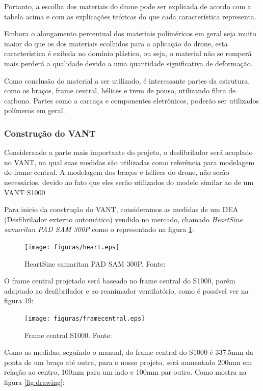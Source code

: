 Portanto, a escolha dos materiais do drone pode ser explicada de acordo com a tabela acima e com as explicações teóricas do que cada característica representa. 

Embora o alongamento percentual dos materiais poliméricos em geral seja muito maior do que os dos materiais ecolhidos para a aplicação do drone, esta característica é exibida no domínio plástico, ou seja, o material não se romperá mais perderá a qualidade devido a uma quantidade significativa de deformação.

Como conclusão do material a ser utilizado, é interessante partes da estrutura, como os braços, frame central, hélices e trem de pouso, utilizando fibra de carbono. Partes como a carcaça e componentes eletrônicos, poderão ser utilizados polímeros em geral. 

\subsubsection{Construção do VANT}

Considerando a parte mais importante do projeto, o desfibrilador será acoplado no VANT, na qual suas medidas são utilizadas como referência para modelagem do frame central.  A modelagem dos braços e hélices do drone,  não serão necessários, devido ao fato que eles serão utilizados do modelo similar ao de um VANT S1000

Para inicio da construção do VANT, consideramos as medidas de um DEA (Desfibrilador externo automático) vendido no mercado, chamado \textit{HeartSine samaritan PAD SAM 300P}  como o representado na figura \ref{fig:heart}:

\begin{figure}[H]
    \centering
      \texttt{[image: figuras/heart.eps]}
    \caption{ HeartSine samaritan PAD SAM 300P. Fonte: \cite{aedsingapore}}
    \label{fig:heart}
\end{figure}

O frame central projetado será baseado no frame central do S1000, porém adaptado ao desfibrilador e ao reanimador ventilatório, como é possível ver na figura 19: 

\begin{figure}[H]
    \centering
      \texttt{[image: figuras/framecentral.eps]}
    \caption{ Frame central S1000. Fonte: \cite{heliguy}}
    \label{fig:framecentral}
\end{figure}


Como as medidas, seguindo o manual, do frame central do S1000 é 337.5mm da ponta de um braço até outra, para o nosso projeto, será aumentado  200mm em relação ao centro, 100mm para um lado e 100mm par outro. Como mostra na figura \ref{fig:drawing}:

